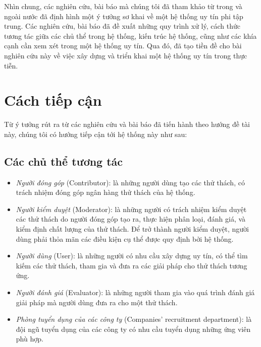 Nhìn chung, các nghiên cứu, bài báo mà chúng tôi đã tham khảo từ trong và ngoài nước đã định hình một ý tưởng sơ khai về một hệ thống uy tín phi tập trung. Các nghiên cứu, bài báo đã đề xuất những quy trình xử lý, cách thức tương tác giữa các chủ thể trong hệ thống, kiến trúc hệ thống, cũng như các khía cạnh cần xem xét trong một hệ thống uy tín. Qua đó, đã tạo tiền đề cho bài nghiên cứu này về việc xây dựng và triển khai một hệ thống uy tín trong thực tiễn.

\section{Cách tiếp cận}

Từ ý tưởng rút ra từ các nghiên cứu và bài báo đã tiến hành theo hướng đề tài này, chúng tôi có hướng tiếp cận tới hệ thống này như sau:

\subsection{Các chủ thể tương tác}
\begin{itemize}
  \item \textit{Người đóng góp} (Contributor): là những người dùng tạo các thử thách, có trách nhiệm đóng góp ngân hàng thử thách của hệ thống.
  \item \textit{Người kiểm duyệt} (Moderator): là những người có trách nhiệm kiểm duyệt các thử thách do người đóng góp tạo ra, thực hiện phân loại, đánh giá, và kiểm định chất lượng của thử thách. Để trở thành người kiểm duyệt, người dùng phải thỏa mãn các điều kiện cụ thể được quy định bởi hệ thống.
  \item \textit{Người dùng} (User): là những người có nhu cầu xây dựng uy tín, có thể tìm kiếm các thử thách, tham gia và đưa ra các giải pháp cho thử thách tương ứng.
  \item \textit{Người đánh giá} (Evaluator): là những người tham gia vào quá trình đánh giá giải pháp mà người dùng đưa ra cho một thử thách.
  \item \textit{Phòng tuyển dụng của các công ty} (Companies' recruitment department): là đội ngũ tuyển dụng của các công ty có nhu cầu tuyển dụng những ứng viên phù hợp.
\end{itemize}

